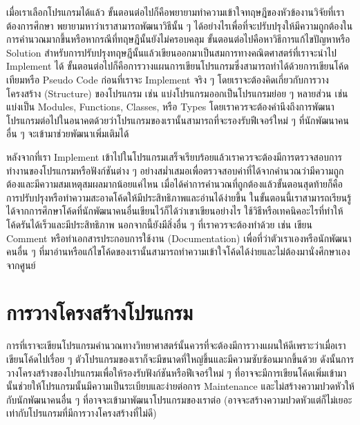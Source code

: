 เมื่อเราเลือกโปรแกรมได้แล้ว ขั้นตอนต่อไปก็คือพยายามทำความเข้าใจทฤษฎีของหัวข้องานวิจัยที่เราต้องการศึกษา พยายามหาว่าเราสามารถพัฒนาวิธีนั้น ๆ ได้อย่างไรเพื่อที่จะปรับปรุงให้มีความถูกต้องในการคำนวณมากขึ้นหรือหากรณีที่ทฤษฎีนั้นยังไม่ครอบคลุม ขั้นตอนต่อไปคือหาวิธีการแก้ไขปัญหาหรือ Solution สำหรับการปรับปรุงทฤษฎีนั้นแล้วเขียนออกมาเป็นสมการทางคณิตศาสตร์ที่เราจะนำไป Implement ได้ ขั้นตอนต่อไปก็คือการวางแผนการเขียนโปรแกรมซึ่งสามารถทำได้ด้วยการเขียนโค้ดเทียมหรือ Pseudo Code ก่อนที่เราจะ Implement จริง ๆ โดยเราจะต้องคิดเกี่ยวกับการวางโครงสร้าง (Structure) ของโปรแกรม เช่น แบ่งโปรแกรมออกเป็นโปรแกรมย่อย ๆ หลายส่วน เช่น แบ่งเป็น Modules, Functions, Classes, หรือ Types โดยเราควรจะต้องคำนึงถึงการพัฒนาโปรแกรมต่อไปในอนาคตด้วยว่าโปรแกรมของเรานั้นสามารถที่จะรองรับฟีเจอร์ใหม่ ๆ ที่นักพัฒนาคนอื่น ๆ จะเข้ามาช่วยพัฒนาเพิ่มเติมได้

หลังจากที่เรา Implement เข้าไปในโปรแกรมเสร็จเรียบร้อยแล้วเราควรจะต้องมีการตรวจสอบการทำงานของโปรแกรมหรือฟังก์ชันต่าง ๆ อย่างสม่ำเสมอเพื่อตรวจสอบค่าที่ได้จากคำนวณว่ามีความถูกต้องและมีความสมเหตุสมผลมากน้อยแค่ไหน เมื่อได้ค่าการคำนวณที่ถูกต้องแล้วขั้นตอนสุดท้ายก็คือการปรับปรุงหรือทำความสะอาดโค้ดให้มีประสิทธิภาพและอ่านได้ง่ายขึ้น ในขั้นตอนนี้เราสามารถเรียนรู้ได้จากการศึกษาโค้ดที่นักพัฒนาคนอื่นเขียนไว้ก็ได้ว่าเขาเขียนอย่างไร ใช้วิธีหรือเทคนิคอะไรที่ทำให้โค้ดรันได้เร็วและมีประสิทธิภาพ นอกจากนี้ยังมีสิ่งอื่น ๆ ที่เราควรจะต้องทำด้วย เช่น เขียน Comment หรือทำเอกสารประกอบการใช้งาน (Documentation) เพื่อที่ว่าตัวเราเองหรือนักพัฒนาคนอื่น ๆ ที่มาอ่านหรือแก้ไขโค้ดของเรานั้นสามารถทำความเข้าใจโค้ดได้ง่ายและไม่ต้องมานั่งศึกษาเองจากศูนย์

\section{การวางโครงสร้างโปรแกรม}

การที่เราจะเขียนโปรแกรมคำนวณทางวิทยาศาสตร์นั้นควรที่จะต้องมีการวางแผนให้ดีเพราะว่าเมื่อเราเขียนโค้ดไปเรื่อย ๆ ตัวโปรแกรมของเราก็จะมีขนาดที่ใหญ่ขึ้นและมีความซับซ้อนมากขึ้นด้วย ดังนั้นการวางโครงสร้างของโปรแกรมเพื่อให้รองรับฟังก์ชันหรือฟีเจอร์ใหม่ ๆ ที่อาจจะมีการเขียนโค้ดเพิ่มเข้ามานั้นช่วยให้โปรแกรมนั้นมีความเป็นระเบียบและง่ายต่อการ Maintenance และไม่สร้างความปวดหัวให้กับนักพัฒนาคนอื่น ๆ ที่อาจจะเข้ามาพัฒนาโปรแกรมของเราต่อ (อาจจะสร้างความปวดหัวแต่ก็ไม่เยอะเท่ากับโปรแกรมที่มีการวางโครงสร้างที่ไม่ดี)

